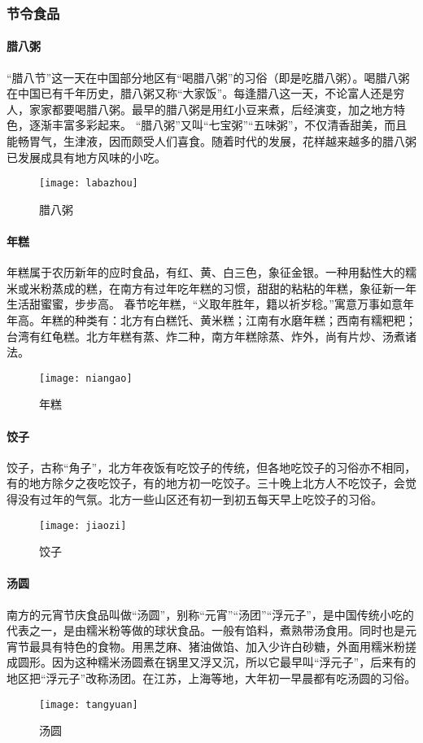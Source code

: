 \subsubsection{节令食品}

\paragraph{腊八粥}
“腊八节”这一天在中国部分地区有“喝腊八粥”的习俗（即是吃腊八粥）。喝腊八粥在中国已有千年历史，腊八粥又称“大家饭”。每逢腊八这一天，不论富人还是穷人，家家都要喝腊八粥。最早的腊八粥是用红小豆来煮，后经演变，加之地方特色，逐渐丰富多彩起来。
“腊八粥”又叫“七宝粥”“五味粥”，不仅清香甜美，而且能畅胃气，生津液，因而颇受人们喜食。随着时代的发展，花样越来越多的腊八粥已发展成具有地方风味的小吃。
\begin{figure}[htb]
    \centering
    \texttt{[image: labazhou]}
    \caption{腊八粥}
\end{figure}
\paragraph{年糕}
年糕属于农历新年的应时食品，有红、黄、白三色，象征金银。一种用黏性大的糯米或米粉蒸成的糕，在南方有过年吃年糕的习惯，甜甜的粘粘的年糕，象征新一年生活甜蜜蜜，步步高。
春节吃年糕，“义取年胜年，籍以祈岁稔。”寓意万事如意年年高。年糕的种类有：北方有白糕饦、黄米糕；江南有水磨年糕；西南有糯粑粑；台湾有红龟糕。北方年糕有蒸、炸二种，南方年糕除蒸、炸外，尚有片炒、汤煮诸法。 
\begin{figure}[htb]
    \centering
    \texttt{[image: niangao]}
    \caption{年糕}
\end{figure}
\paragraph{饺子}
饺子，古称“角子”，北方年夜饭有吃饺子的传统，但各地吃饺子的习俗亦不相同，有的地方除夕之夜吃饺子，有的地方初一吃饺子。三十晚上北方人不吃饺子，会觉得没有过年的气氛。北方一些山区还有初一到初五每天早上吃饺子的习俗。
\begin{figure}[htb]
    \centering
    \texttt{[image: jiaozi]}
    \caption{饺子}
\end{figure}
\paragraph{汤圆}
南方的元宵节庆食品叫做“汤圆”，别称“元宵”“汤团”“浮元子”，是中国传统小吃的代表之一，是由糯米粉等做的球状食品。一般有馅料，煮熟带汤食用。同时也是元宵节最具有特色的食物。用黑芝麻、猪油做馅、加入少许白砂糖，外面用糯米粉搓成圆形。因为这种糯米汤圆煮在锅里又浮又沉，所以它最早叫“浮元子”，后来有的地区把“浮元子”改称汤团。在江苏，上海等地，大年初一早晨都有吃汤圆的习俗。
\begin{figure}[htb]
    \centering
    \texttt{[image: tangyuan]}
    \caption{汤圆}
\end{figure}

